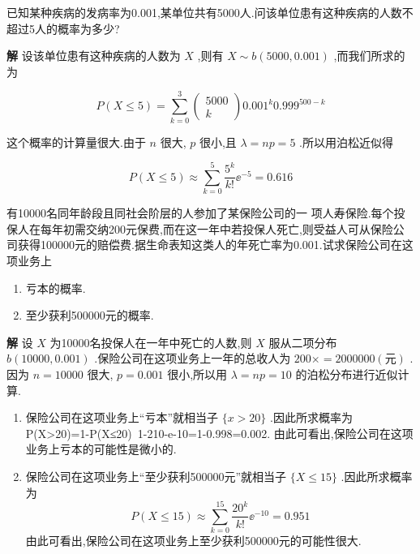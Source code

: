\begin{example}\label{exam:2.4.6}
	已知某种疾病的发病率为0.001,某单位共有5000人.问该单位患有这种疾病的人数不超过5人的概率为多少?
	
	\textbf{解} 设该单位患有这种疾病的人数为 $ X $ ,则有 $ X\sim b(5000,0.001) $ ,而我们所求的为
	
	\[
	P(X \leqslant 5)=\sum_{k=0}^{3} \left( 
	\begin{array}{c}{5000} \\ 
	{k}
	\end{array}\right) 0.001^{k} 0.999^{500-k}
	\]
	
	这个概率的计算量很大.由于 $ n $ 很大, $ p $ 很小,且 $ \lambda=n p=5 $ .所以用泊松近似得
	
	\[
	P(X \leqslant 5) \approx \sum_{k=0}^{5} \frac{5^{k}}{k !} \ee ^{-5}=0.616
	\]
	
\end{example}

\begin{example}\label{exam:2.4.7}
	有10000名同年龄段且同社会阶层的人参加了某保险公司的一
	项人寿保险.每个投保人在每年初需交纳200元保费,而在这一年中若投保人死亡,则受益人可从保险公司获得100000元的赔偿费.据生命表知这类人的年死亡率为0.001.试求保险公司在这项业务上
	
	\begin{enumerate}
		\item 亏本的概率.
		\item 至少获利500000元的概率.
	\end{enumerate}
	
	\textbf{解} 设 $ X $ 为10000名投保人在一年中死亡的人数,则 $ X $ 服从二项分布 $ b(10000,0.001) $ .保险公司在这项业务上一年的总收人为 $ 200\times = 2000000(\text{元}) $ .因为 $ n=10000 $ 很大, $ p=0.001 $ 很小,所以用 $ \lambda =np=10 $ 的泊松分布进行近似计算.
	
	\begin{enumerate}
		\item 保险公司在这项业务上“亏本”就相当子 $ \{x>20\} $ .因此所求概率为P(X>20)=1-P(X≤20)~1-210-e-10=1-0.998=0.002.
		由此可看出,保险公司在这项业务上亏本的可能性是微小的.
		\item 保险公司在这项业务上“至少获利500000元”就相当子 $ \{X \leqslant 15\} $ .因此所求概率为
		\[
		P(X \leqslant 15) \approx \sum_{k=0}^{15} \frac{20^{k}}{k !} \ee ^{-10}=0.951
		\]
		由此可看出,保险公司在这项业务上至少获利500000元的可能性很大.
	\end{enumerate}
\end{example}

